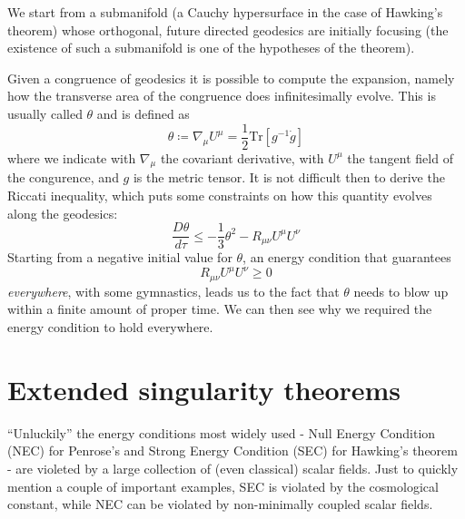 \documentclass[12pt, a4paper]{article}
\begin{document}
We start from a submanifold (a Cauchy hypersurface in the case of Hawking's theorem) whose orthogonal, future directed geodesics are initially focusing (the existence of such a submanifold is one of the hypotheses of the theorem).

Given a congruence of geodesics it is possible to compute the expansion, namely how the transverse area of the congruence does infinitesimally evolve. This is usually called \(\theta\) and is defined as 
\[
\theta \coloneqq \nabla_{\mu} U^{\mu} = \frac{1}{2} \text{Tr}\left[g^{-1}\dot{g}\right]
\]
where we indicate with \(\nabla_{\mu}\) the covariant derivative, with \(U^{\mu}\) the tangent field of the congurence, and \(g\) is the metric tensor.
It is not difficult then to derive the Riccati inequality, which puts some constraints on how this quantity evolves along the geodesics:
\[
\frac{D\theta }{d\tau} \le -\frac{1}{3} \theta ^2 - R_{\mu\nu}U^{\mu}U^{\nu}
\]
Starting from a negative initial value for \(\theta\), an energy condition that guarantees 
\[
R_{\mu\nu}U^{\mu}U^{\nu} \ge 0
\]
\emph{everywhere}, with some gymnastics, leads us to the fact that \(\theta\) needs to blow up within a finite amount of proper time.
We can then see why we required the energy condition to hold everywhere.

\section{Extended singularity theorems}
``Unluckily'' the energy conditions most widely used - Null Energy Condition (NEC) for Penrose's and Strong Energy Condition (SEC) for Hawking's theorem - are violeted by a large collection of (even classical) scalar fields. 
Just to quickly mention a couple of important examples, SEC is violated by the cosmological constant, while NEC can be violated by non-minimally coupled scalar fields.

%

\end{document}
